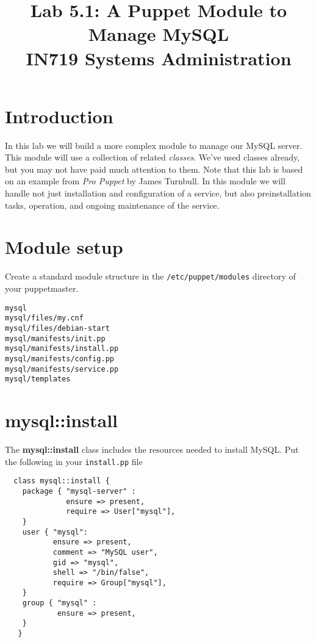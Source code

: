\documentclass{article}   	%
\title{Lab 5.1: A Puppet Module to Manage MySQL \\ IN719 Systems Administration}
\date{}							%
\begin{document}
\maketitle

\section*{Introduction}
In this lab we will build a more complex module to manage our MySQL server.  This module will use a collection of related \emph{classes}.  We've used classes already, but you may not have paid much attention to them.  Note that this lab is based on an example from \emph{Pro Puppet} by James Turnbull.  In this module we will handle not just installation and configuration of a service, but also preinstallation tasks, operation, and ongoing maintenance of the service.
\section{Module setup}
Create a standard module structure in the \texttt{/etc/puppet/modules} directory of your puppetmaster.

\texttt{mysql} \\
\texttt{mysql/files/my.cnf} \\
\texttt{mysql/files/debian-start} \\
\texttt{mysql/manifests/init.pp} \\
\texttt{mysql/manifests/install.pp} \\
\texttt{mysql/manifests/config.pp} \\
\texttt{mysql/manifests/service.pp} \\
\texttt{mysql/templates} \\



\section{mysql::install}
The \textbf{mysql::install} class includes the resources needed to install MySQL.  Put the following in your \texttt{install.pp} file

\begin{verbatim}
  class mysql::install {
    package { "mysql-server" :
              ensure => present,
              require => User["mysql"],
    }
    user { "mysql":
           ensure => present,
           comment => "MySQL user",
           gid => "mysql",
           shell => "/bin/false",
           require => Group["mysql"],
    }
    group { "mysql" :
            ensure => present,
    }
   }

\end{verbatim}
\end{document}
